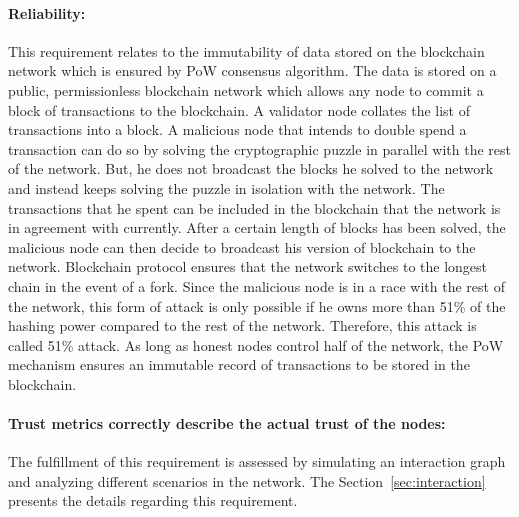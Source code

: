 %
%		
\paragraph{Reliability:}This requirement relates to the immutability of data
stored on the blockchain network which is ensured by PoW consensus algorithm.
The data is stored on a public, permissionless blockchain network which allows
any node to commit a block of transactions to the blockchain. A validator node
collates the list of transactions into a block. A malicious node that intends
to double spend a transaction can do so by solving the cryptographic puzzle in
parallel with the rest of the network. But, he does not broadcast the blocks he
solved to the network and instead keeps solving the puzzle in isolation with
the network. The transactions that he spent can be included in the blockchain
that the network is in agreement with currently. After a certain length of
blocks has been solved, the malicious node can then decide to broadcast his
version of blockchain to the network. Blockchain protocol ensures that the
network switches to the longest chain in the event of a fork. Since the
malicious node is in a race with the rest of the network, this form of attack
is only possible if he owns more than 51\% of the hashing power compared to the
rest of the network. Therefore, this attack is called 51\% attack. As long as
honest nodes control half of the network, the PoW mechanism ensures an
immutable record of transactions to be stored in the blockchain.   
\paragraph{Trust metrics correctly describe the actual trust of the nodes:}The
fulfillment of this requirement is assessed by simulating an interaction graph
and analyzing different scenarios in the network. The
Section~\ref{sec:interaction} presents the details regarding this requirement. 
